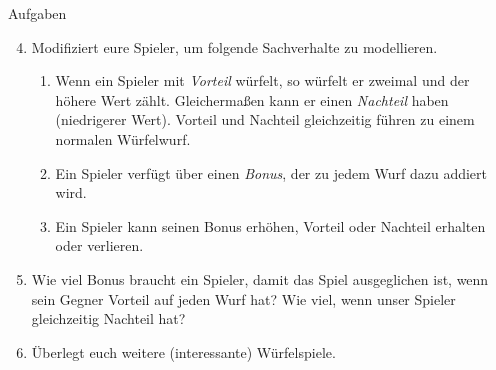 \begin{frame}{Aufgaben}
	\begin{enumerate}
		\setcounter{enumi}{3}
		\item Modifiziert eure Spieler, um folgende Sachverhalte zu modellieren.
			\begin{enumerate}
				\item Wenn ein Spieler mit \textit{Vorteil} würfelt, so würfelt er zweimal und der höhere Wert zählt. Gleichermaßen kann er einen \textit{Nachteil} haben (niedrigerer Wert). Vorteil und Nachteil gleichzeitig führen zu einem normalen Würfelwurf.
				\item Ein Spieler verfügt über einen \textit{Bonus}, der zu jedem Wurf dazu addiert wird.
				\item Ein Spieler kann seinen Bonus erhöhen, Vorteil oder Nachteil erhalten oder verlieren.
			\end{enumerate}
		\item Wie viel Bonus braucht ein Spieler, damit das Spiel ausgeglichen ist, wenn sein Gegner Vorteil auf jeden Wurf hat? Wie viel, wenn unser Spieler gleichzeitig Nachteil hat?
		\item Überlegt euch weitere (interessante) Würfelspiele.
	\end{enumerate}
\end{frame}


